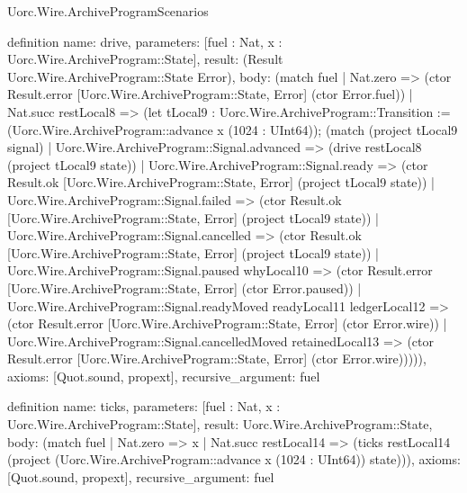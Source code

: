 \begin{lexlean}{Uorc.Wire.ArchiveProgramScenarios}
\begin{semanticmodule}
definition{
  name: drive,
  parameters: [fuel : Nat, x : Uorc.Wire.ArchiveProgram::State],
  result: (Result Uorc.Wire.ArchiveProgram::State Error),
  body: (match fuel
    | Nat.zero => (ctor Result.error [Uorc.Wire.ArchiveProgram::State, Error] (ctor Error.fuel))
    | Nat.succ restLocal8 => (let tLocal9 : Uorc.Wire.ArchiveProgram::Transition := (Uorc.Wire.ArchiveProgram::advance x (1024 : UInt64)); (match (project tLocal9 signal)
      | Uorc.Wire.ArchiveProgram::Signal.advanced => (drive restLocal8 (project tLocal9 state))
      | Uorc.Wire.ArchiveProgram::Signal.ready => (ctor Result.ok [Uorc.Wire.ArchiveProgram::State, Error] (project tLocal9 state))
      | Uorc.Wire.ArchiveProgram::Signal.failed => (ctor Result.ok [Uorc.Wire.ArchiveProgram::State, Error] (project tLocal9 state))
      | Uorc.Wire.ArchiveProgram::Signal.cancelled => (ctor Result.ok [Uorc.Wire.ArchiveProgram::State, Error] (project tLocal9 state))
      | Uorc.Wire.ArchiveProgram::Signal.paused whyLocal10 => (ctor Result.error [Uorc.Wire.ArchiveProgram::State, Error] (ctor Error.paused))
      | Uorc.Wire.ArchiveProgram::Signal.readyMoved readyLocal11 ledgerLocal12 => (ctor Result.error [Uorc.Wire.ArchiveProgram::State, Error] (ctor Error.wire))
      | Uorc.Wire.ArchiveProgram::Signal.cancelledMoved retainedLocal13 => (ctor Result.error [Uorc.Wire.ArchiveProgram::State, Error] (ctor Error.wire))))),
  axioms: [Quot.sound, propext],
  recursive_argument: fuel
}

definition{
  name: ticks,
  parameters: [fuel : Nat, x : Uorc.Wire.ArchiveProgram::State],
  result: Uorc.Wire.ArchiveProgram::State,
  body: (match fuel
    | Nat.zero => x
    | Nat.succ restLocal14 => (ticks restLocal14 (project (Uorc.Wire.ArchiveProgram::advance x (1024 : UInt64)) state))),
  axioms: [Quot.sound, propext],
  recursive_argument: fuel
}


\end{semanticmodule}
\end{lexlean}
